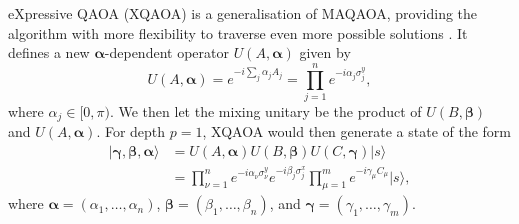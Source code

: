    eXpressive QAOA (XQAOA) is a generalisation of MAQAOA, providing the algorithm with more flexibility to traverse even more possible solutions \cite{vijendran2023expressive}. It defines a new $\pmb{\alpha}$-dependent operator $U(A,\pmb{\alpha})$ given by
    \begin{equation}
        U(A,\pmb{\alpha}) = e^{-i\sum_j\alpha_jA_j} = \prod^n_{j=1}e^{-i\alpha_j\sigma^y_j},
    \end{equation}
    where $\alpha_j\in[0,\pi)$. We then let the mixing unitary be the product of $U(B,\pmb{\beta})$ and $U(A,\pmb{\alpha})$. For depth $p=1$, XQAOA would then generate a state of the form
    \begin{align}
        |\pmb{\gamma},\pmb{\beta},\pmb{\alpha}\rangle &= U(A,\pmb{\alpha})U(B,\pmb{\beta})U(C,\pmb{\gamma})|s\rangle \nonumber \\
        &= \prod^n_{\nu=1}e^{-i\alpha_\nu \sigma^y_\nu}e^{-i\beta_j\sigma^x_j}\prod^m_{\mu=1}e^{-i\gamma_\mu C_\mu}|s\rangle,
    \end{align}
    where $\pmb{\alpha}=(\alpha_1,\dots,\alpha_n)$, $\pmb{\beta} = (\beta_1,\dots,\beta_n)$, and $\pmb{\gamma} = (\gamma_1,\dots,\gamma_m)$.

        

        

